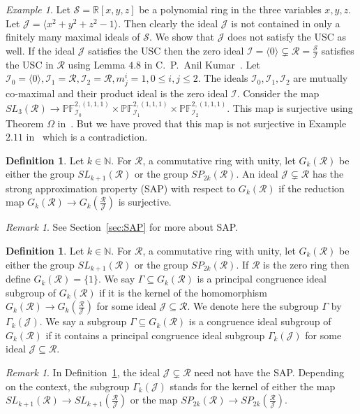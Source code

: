 \documentclass[12pt]{amsart}
\newcommand{\Gom}{\Omega}
\newcommand{\sbnq}{\subsetneq}
\newcommand{\mbb}{\mathbb}
\newcommand{\mcl}{\mathcal}
\newcommand{\lra}{\longrightarrow}
\newcommand{\I}{\mcl I}
\newcommand{\N}{\mbb N}
\newcommand{\R}{\mcl R}
\theoremstyle{plain}
\theoremstyle{definition}
\newtheorem{defn}[theorem]{Definition}
\theoremstyle{remark}
\newtheorem{remark}[theorem]{Remark}
\newtheorem{example}[theorem]{Example}
\numberwithin{equation}{section}
\begin{document}
\begin{example}
	\label{Example:NotUSC}
	Let $\mcl{S}=\mbb{R}[x,y,z]$ be a polynomial ring in the three variables $x,y,z$. Let $\mcl{J}=\langle x^2+y^2+z^2-1\rangle$. Then clearly the ideal $\mcl{J}$ is not contained in only a finitely many maximal ideals of $\mcl{S}$. We show that $\mcl{J}$ does not satisfy the USC as well. If the ideal $\mcl{J}$ satisfies the USC then the zero ideal $\I=\langle 0\rangle \sbnq \R=\frac{\mcl{S}}{\I}$ satisfies the USC in $\R$ using Lemma $4.8$ in C.~P.~Anil Kumar~\cite{CPAKII}. Let $\mcl{I}_0=\langle 0\rangle,\mcl{I}_1=\R,\mcl{I}_2=\R, m^i_j=1, 0\leq i,j\leq 2$. The ideals $\I_0,\I_1,\I_2$ are mutually co-maximal and their product ideal is the zero ideal $\I$. Consider the map $SL_3(\R) \lra \mbb{PF}_{\mcl{I}_0}^{2,(1,1,1)} \times \mbb{PF}_{\mcl{I}_1}^{2,(1,1,1)} \times \mbb{PF}_{\mcl{I}_2}^{2,(1,1,1)}$. This map is surjective using Theorem $\Gom$ in~\cite{CPAKII}. But we have proved that this map is not surjective in Example $2.11$ in~\cite{CPAKII} which is a contradiction.
\end{example}
\begin{defn}
Let $k\in \N$. For $\R$, a commutative ring with unity, let $G_k(\R)$ be either the group $SL_{k+1}(\R)$ or the group $SP_{2k}(\R)$. An ideal $\mcl{J}\sbnq \R$ has the strong approximation property (SAP) with respect to $G_k(\R)$ if the reduction map $G_k(\R) \lra G_k(\frac{\R}{\mcl{J}})$ is surjective.
\end{defn}
\begin{remark}
See Section~\ref{sec:SAP} for more about SAP.
\end{remark}
\begin{defn}
	\label{defn:CIS}
Let $k\in \N$. For $\R$, a commutative ring with unity, let $G_k(\R)$ be either the group $SL_{k+1}(\R)$ or the group $SP_{2k}(\R)$. If $\R$ is the zero ring then define $G_k(\R)=\{1\}$. We say $\Gamma \subseteq G_k(\R)$  is a principal congruence ideal subgroup of $G_k(\R)$ if it is the kernel of the homomorphism $G_k(\R)\lra G_k(\frac{\R}{\mcl{J}})$ for some ideal $\mcl{J}\subseteq \R$. We denote here the subgroup $\Gamma$ by $\Gamma_k(\mcl{J})$. We say a subgroup $\Gamma \subseteq G_k(\R)$ is a congruence ideal subgroup of $G_k(\R)$ if it contains a principal congruence ideal subgroup $\Gamma_k(\mcl{J})$ for some ideal $\mcl{J}\subseteq\R$.
\end{defn}
\begin{remark}
In Definition~\ref{defn:CIS}, the ideal $\mcl{J}\sbnq \R$ need not have the SAP.  Depending on the context, the subgroup $\Gamma_k(\mcl{J})$ stands for the kernel of either the map $SL_{k+1}(\R)\lra SL_{k+1}(\frac{\R}{\mcl{J}})$ or the map $SP_{2k}(\R)\lra SP_{2k}(\frac{\R}{\mcl{J}})$.
\end{remark}
\end{document}
